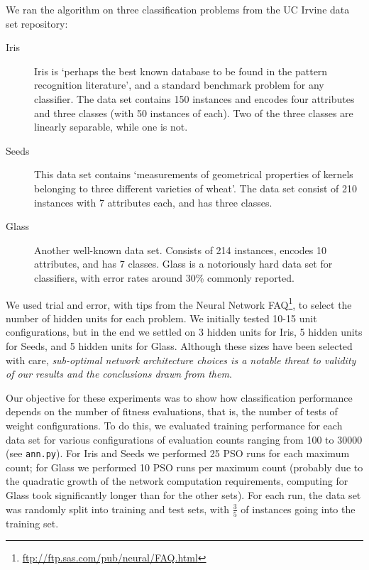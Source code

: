 \documentclass[a4paper,final,9pt]{article}
\begin{document}
We ran the algorithm on three classification problems from the UC Irvine data
set repository:
\begin{description}
  \item[Iris] Iris is `perhaps the best known database to be found in the
    pattern recognition literature', and a standard benchmark problem for any
    classifier. The data set contains 150 instances and encodes four attributes
    and three classes (with 50 instances of each). Two of the three classes
    are linearly separable, while one is not.

  \item[Seeds] This data set contains `measurements of geometrical properties
    of kernels belonging to three different varieties of wheat'. The data set
    consist of 210 instances with 7 attributes each, and has three classes.

  \item[Glass] Another well-known data set. Consists of 214 instances,
    encodes 10 attributes, and has 7 classes. Glass is a notoriously hard data
    set for classifiers, with error rates around 30\% commonly reported. 
\end{description}

\noindent
We used trial and error, with tips from the Neural Network
FAQ\footnote{\url{ftp://ftp.sas.com/pub/neural/FAQ.html}}, to select the
number of hidden units for each problem. We initially tested 10-15 unit
configurations, but in the end we settled on 3 hidden units for Iris, 5 hidden
units for Seeds, and 5 hidden units for Glass. Although these sizes have been
selected with care, \emph{sub-optimal network architecture choices is a
notable threat to validity of our results and the conclusions drawn from
them}.

Our objective for these experiments was to show how classification performance
depends on the number of fitness evaluations, that is, the number of tests of
weight configurations. To do this, we evaluated training performance for each
data set for various configurations of evaluation counts ranging from 100 to
30000 (see \texttt{ann.py}). For Iris and Seeds we performed 25 PSO runs for
each maximum count; for Glass we performed 10 PSO runs per maximum count
(probably due to the quadratic growth of the network computation requirements,
computing for Glass took significantly longer than for the other sets).
For each run, the data set was randomly split into training and test sets,
with $\frac{3}{5}$ of instances going into the training set.
\end{document}
